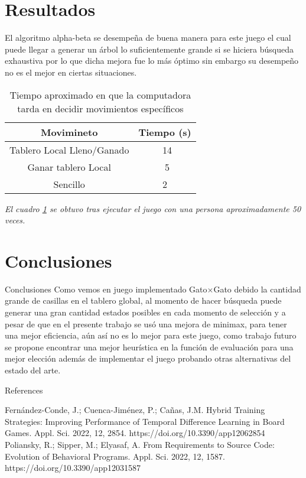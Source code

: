 \documentclass{beamer}
\begin{document}
\section{Resultados}
\begin{frame}
El algoritmo alpha-beta se desempeña de buena manera para este juego el cual puede llegar a generar un árbol lo suficientemente grande si se hiciera búsqueda exhaustiva por lo que dicha mejora fue lo más óptimo sin embargo su desempeño no es el mejor en ciertas situaciones.
\begin{table}
\begin{center}
\begin{tabular}{| c | c |}
Movimineto & Tiempo (s) \\ \hline
Tablero Local Lleno/Ganado & ~14  \\
Ganar tablero Local & ~5\\
Sencillo &  2 \\ \hline
\end{tabular}
\caption{Tiempo aproximado en que la computadora tarda en decidir movimientos específicos}
\label{tab:1}
\end{center}
\end{table}
\textit{El cuadro \ref{tab:1} se obtuvo tras ejecutar el juego con una persona aproximadamente 50 veces.}
\end{frame}

%
%
\section{Conclusiones}
\begin{frame}{Conclusiones}
  \centering
Como vemos en juego implementado Gato$\times$Gato debido la cantidad grande de casillas en el tablero global, al momento de hacer búsqueda puede generar una gran cantidad estados posibles en cada momento de selección y a pesar de que en el presente trabajo se usó una mejora de minimax, para tener una mejor eficiencia, aún así no es lo mejor para este juego, como trabajo futuro se propone encontrar una mejor heurística en la función de evaluación para una mejor elección además de implementar el juego probando otras alternativas del estado del arte.

\end{frame}

\begin{frame}{References}
\begin{thebibliography}{8}
Fernández-Conde, J.; Cuenca-Jiménez, P.; Cañas, J.M. Hybrid Training Strategies: Improving Performance of Temporal Difference Learning in Board Games. Appl. Sci. 2022, 12, 2854. https://doi.org/10.3390/app12062854
Poliansky, R.; Sipper, M.; Elyasaf, A. From Requirements to Source Code: Evolution of Behavioral Programs. Appl. Sci. 2022, 12, 1587. https://doi.org/10.3390/app12031587

\end{thebibliography}
\end{frame}

\end{document}
